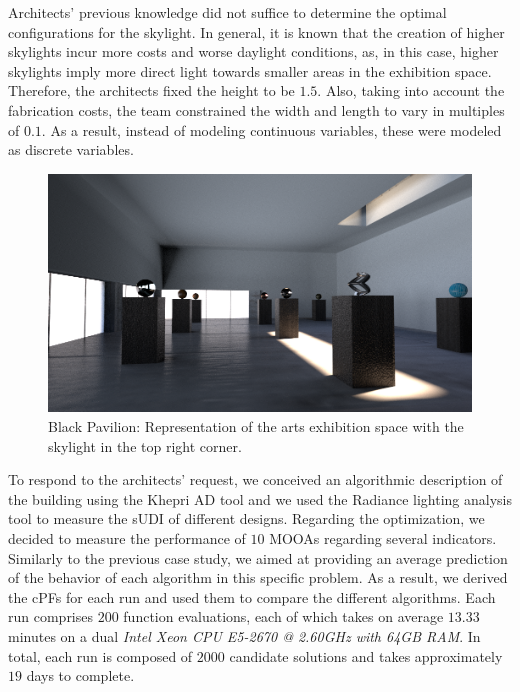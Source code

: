 Architects' previous knowledge did not suffice to determine the optimal configurations for the skylight. In general, it is known that the creation of higher skylights incur more costs and worse daylight conditions, as, in this case, higher skylights imply more direct light towards smaller areas in the exhibition space. Therefore, the architects fixed the height to be $1.5$\metre. Also, taking into account the fabrication costs, the team constrained the width and length to vary in multiples of $0.1$\metre. As a result, instead of modeling continuous variables, these were modeled as discrete variables.
\begin{figure}[h!]
	\centering
	\includegraphics[width=\textwidth]{Images/Evaluation/BlackPavilion/PavPretoExample116x7204.png}
	\caption[Black Pavilion: Representation of the arts exhibition space with a skylight]{Black Pavilion: Representation of the arts exhibition space with the skylight in the top right corner.}
	\label{fig:blackpavilion}
\end{figure}

To respond to the architects' request, we conceived an algorithmic description of the building using the Khepri \ac{AD} tool and we used the Radiance lighting analysis tool to measure the \ac{sUDI} of different designs. Regarding the optimization, we decided to measure the performance of $10$ \acp{MOOA} regarding several indicators. Similarly to the previous case study, we aimed at providing an average prediction of the behavior of each algorithm in this specific problem. As a result, we derived the \acp{cPF} for each run and used them to compare the different algorithms. Each run comprises $200$ function evaluations, each of which takes on average $13.33$ minutes on a dual \textit{Intel Xeon CPU E5-2670 @ 2.60GHz with 64GB RAM}. In total, each run is composed of $2000$ candidate solutions and takes approximately $19$ days to complete.

